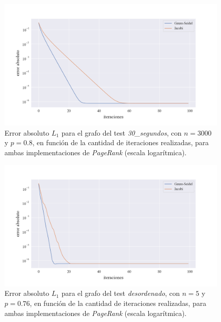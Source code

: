 \newpage
\begin{figure}[!htbp]
    \centering
    \includegraphics[width=1\textwidth, trim=0 0 0 10]{files/src/.media/convergencia_test_30_segundos.png}
    \caption{Error absoluto $L_1$ para el grafo del test \textit{30\_segundos}, con $n = 3000$ y $p = 0.8$, en función de la cantidad de iteraciones realizadas, para ambas implementaciones de \textit{PageRank} (escala logarítmica).} \label{test_30_segundos}
\end{figure}

\begin{figure}[!htbp]
    \centering
    \includegraphics[width=1\textwidth, trim=0 0 0 30]{files/src/.media/convergencia_test_aleatorio_desordenado.png}
    \caption{Error absoluto $L_1$ para el grafo del test \textit{desordenado}, con $n = 5$ y $p = 0.76$, en función de la cantidad de iteraciones realizadas, para ambas implementaciones de \textit{PageRank} (escala logarítmica).} \label{test_aleatorio_desordenado}
\end{figure}

